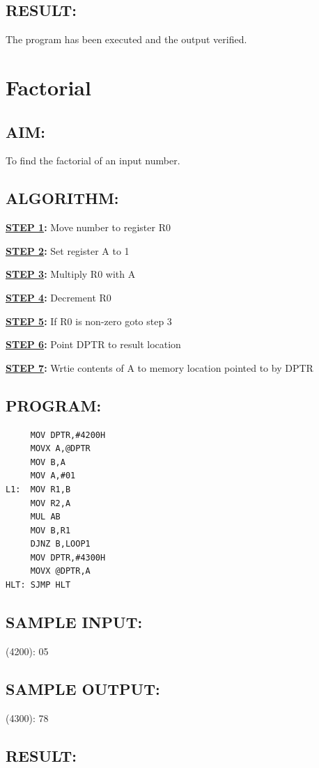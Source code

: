 \documentclass[a4paper,28pt]{report}
\begin{document}
\section*{RESULT:}
The program has been executed and the output verified.
%
%
%
\chapter{Factorial}
\section*{AIM:}

To find the factorial of an input number.

\section*{ALGORITHM:}
\textbf{\underline{STEP 1}:} Move number to register R0

\textbf{\underline{STEP 2}:} Set register A to 1

\textbf{\underline{STEP 3}:} Multiply R0 with A

\textbf{\underline{STEP 4}:} Decrement R0

\textbf{\underline{STEP 5}:} If R0 is non-zero goto step 3

\textbf{\underline{STEP 6}:} Point DPTR to result location

\textbf{\underline{STEP 7}:} Wrtie contents of A to memory location pointed to by DPTR

\section*{PROGRAM:}
\begin{lstlisting}
     MOV DPTR,#4200H
     MOVX A,@DPTR
     MOV B,A
     MOV A,#01
L1:  MOV R1,B
     MOV R2,A
     MUL AB
     MOV B,R1
     DJNZ B,LOOP1
     MOV DPTR,#4300H
     MOVX @DPTR,A
HLT: SJMP HLT
\end{lstlisting}
\section*{SAMPLE INPUT:}
(4200): 05

\section*{SAMPLE OUTPUT:}
(4300): 78
\section*{RESULT:}
\end{document}

